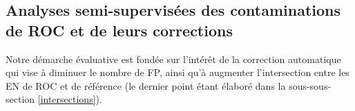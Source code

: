 %    

%    


\subsection{Analyses semi-supervisées des contaminations de ROC et de leurs corrections}

Notre démarche évaluative est fondée sur l'intérêt de la correction automatique qui vise à diminuer le nombre de FP, ainsi qu'à augmenter l'intersection entre les EN de ROC et de référence (le dernier point étant élaboré dans la sous-sous-section \ref{intersections}). 

